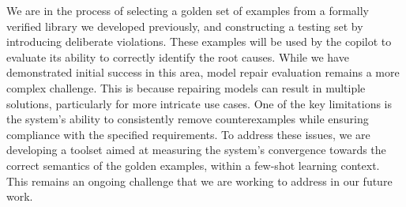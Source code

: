 We are in the process of selecting a golden set of examples from a formally verified library we developed previously, and constructing a testing set by introducing deliberate violations. These examples will be used by the copilot to evaluate its ability to correctly identify the root causes. While we have demonstrated initial success in this area, model repair evaluation remains a more complex challenge. This is because repairing models can result in multiple solutions, particularly for more intricate use cases. One of the key limitations is the system's ability to consistently remove counterexamples while ensuring compliance with the specified requirements. To address these issues, we are developing a toolset aimed at measuring the system’s convergence towards the correct semantics of the golden examples, within a few-shot learning context. This remains an ongoing challenge that we are working to address in our future work. %


